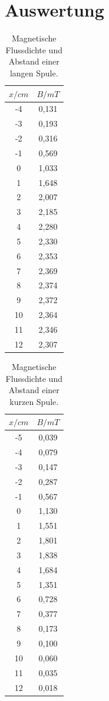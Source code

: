 \section{Auswertung}
\label{sec:Auswertung}

\begin{table}[H]
  \centering
  \caption{Magnetische Flussdichte und Abstand einer langen Spule.}
  \begin{tabular}{c c}
    \toprule
     $x/cm$ & $B/mT$  \\
    \midrule
    -4 & 0,131 \\
    -3 & 0,193 \\
    -2 & 0,316 \\
    -1 & 0,569 \\
    0 & 1,033\\
    1 & 1,648 \\
    2 & 2,007 \\
    3 & 2,185 \\
    4 & 2,280 \\
    5 & 2,330 \\
    6 & 2,353 \\
    7 & 2,369 \\
    8 & 2,374 \\
    9 & 2,372 \\
    10 & 2,364 \\
    11 & 2,346 \\
    12 & 2,307 \\
  \bottomrule
  \end{tabular}
\end{table}

\begin{table}[H]
  \centering
  \caption{Magnetische Flussdichte und Abstand einer kurzen Spule.}
  \begin{tabular}{c c}
    \toprule
     $x/cm$ & $B/mT$  \\
    \midrule
    -5 & 0,039 \\
    -4 & 0,079 \\
    -3 & 0,147 \\
    -2 & 0,287 \\
    -1 & 0,567 \\
    0 & 1,130\\
    1 & 1,551 \\
    2 & 1,801 \\
    3 & 1,838 \\
    4 & 1,684 \\
    5 & 1,351 \\
    6 & 0,728 \\
    7 & 0,377 \\
    8 & 0,173 \\
    9 & 0,100 \\
    10 & 0,060 \\
    11 & 0,035 \\
    12 & 0,018 \\
  \bottomrule
  \end{tabular}
\end{table}


